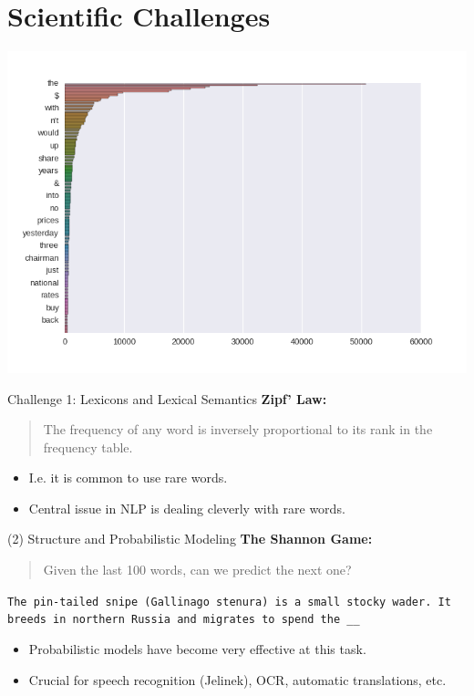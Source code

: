 \documentclass{beamer}
\begin{document}
\section{Scientific Challenges}

\begin{frame}
    \hspace*{-1cm} \includegraphics[width=1.2\textwidth]{../notebooks/zipf}  
\end{frame}


\begin{frame}{Challenge 1: Lexicons and Lexical Semantics}
  \textbf{Zipf' Law:}
  \begin{quote}
    The frequency of any word is inversely proportional to its rank in the frequency table.
  \end{quote}

  \begin{itemize}
  \item I.e. it is common to use rare words. 
  \item Central issue in NLP is dealing cleverly with rare words. 
  \end{itemize}
\end{frame}


\begin{frame}{(2) Structure and Probabilistic Modeling }
  \textbf{The Shannon Game:}
  \begin{quote}
    Given the last 100 words, can we predict the next one?
  \end{quote} 
  

  \texttt{The pin-tailed snipe (Gallinago stenura) is a small stocky wader. It breeds in northern Russia and migrates to spend the \_\_ } 


  \begin{itemize}
  \item Probabilistic models have become very effective at this task.
  \item Crucial for speech recognition (Jelinek), OCR, automatic translations, etc. 
  \end{itemize}



\end{frame}
\end{document}
